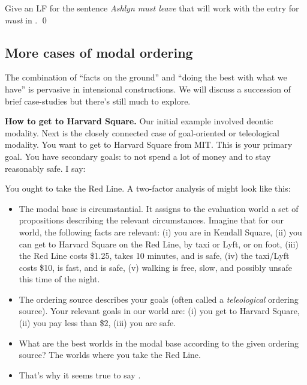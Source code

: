 \begin{exercise}
  Give an LF for the sentence \emph{Ashlyn must leave} that will work with the
  entry for \emph{must} in \Last. \qed
\end{exercise}

\subsection{More cases of modal ordering}
\label{subsec:more-ordering}

The combination of ``facts on the ground'' and ``doing the best with what we
have'' is pervasive in intensional constructions. We will discuss a succession
of brief case-studies but there's still much to explore.

\medskip

\textbf{How to get to Harvard Square.} Our initial example involved deontic modality. Next is the closely connected
case of goal-oriented or teleological modality. You want to get to Harvard
Square from MIT. This is your primary goal. You have secondary goals: to not
spend a lot of money and to stay reasonably safe. I say:

\ex You ought to take the Red Line. \xe
%
%
A two-factor analysis of \Last might look like this:

\begin{itemize}
\item The modal base is circumstantial. It assigns to the evaluation world a set
  of propositions describing the relevant circumstances. Imagine that for our
  world, the following facts are relevant: (i) you are in Kendall Square, (ii)
  you can get to Harvard Square on the Red Line, by taxi or Lyft, or on foot,
  (iii) the Red Line costs \$1.25, takes 10 minutes, and is safe, (iv) the
  taxi/Lyft costs \$10, is fast, and is safe, (v) walking is free, slow, and
  possibly unsafe this time of the night.
\item The ordering source describes your goals (often called a
  \emph{teleological} ordering source). Your relevant goals in our world are:
  (i) you get to Harvard Square, (ii) you pay less than \$2, (iii) you are safe.
\item What are the best worlds in the modal base according to the given ordering
  source? The worlds where you take the Red Line.
\item That's why it seems true to say \Last.
\end{itemize}

